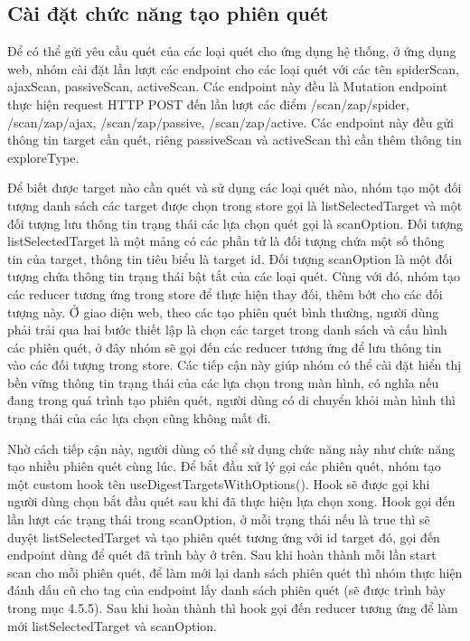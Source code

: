 \subsection{Cài đặt chức năng tạo phiên quét}

\tab Để có thể gửi yêu cầu quét của các loại quét cho ứng dụng hệ thống, ở ứng dụng web, nhóm cài đặt lần lượt các endpoint cho các loại quét với các tên spiderScan, ajaxScan, passiveScan, activeScan. Các endpoint này đều là Mutation endpoint thực hiện request HTTP POST đến lần lượt các điểm /scan/zap/spider, /scan/zap/ajax, /scan/zap/passive, /scan/zap/active. Các endpoint này đều gửi thông tin target cần quét, riêng passiveScan và activeScan thì cần thêm thông tin exploreType.

Để biết được target nào cần quét và sử dụng các loại quét nào, nhóm tạo một đối tượng danh sách các target được chọn trong store gọi là listSelectedTarget và một đối tượng lưu thông tin trạng thái các lựa chọn quét gọi là scanOption. Đối tượng listSelectedTarget là một mảng có các phần tử là đối tượng chứa một số thông tin của target, thông tin tiêu biểu là target id. Đối tượng scanOption là một đối tượng chứa thông tin trạng thái bật tắt của các loại quét. Cùng với đó, nhóm tạo các reducer tương ứng trong store để thực hiện thay đối, thêm bớt cho các đối tượng này. Ở giao diện web, theo các tạo phiên quét bình thường, người dùng phải trải qua hai bước thiết lập là chọn các target trong danh sách và cấu hình các phiên quét, ở đây nhóm sẽ gọi đến các reducer tương ứng để lưu thông tin vào các đối tượng trong store. Các tiếp cận này giúp nhóm có thể cài đặt hiển thị bền vững thông tin trạng thái của các lựa chọn trong màn hình, có nghĩa nếu đang trong quá trình tạo phiên quét, người dùng có di chuyển khỏi màn hình thì trạng thái của các lựa chọn cũng không mất đi.

Nhờ cách tiếp cận này, người dùng có thể sử dụng chức năng này như chức năng tạo nhiều phiên quét cùng lúc. Để bắt đầu xử lý gọi các phiên quét, nhóm tạo một custom hook tên useDigestTargetsWithOptions(). Hook sẽ được gọi khi người dùng chọn bắt đầu quét sau khi đã thực hiện lựa chọn xong. Hook gọi đến lần lượt các trạng thái trong scanOption, ở mỗi trạng thái nếu là true thì sẽ duyệt listSelectedTarget và tạo phiên quét tương ứng với id target đó, gọi đến endpoint dùng để quét đã trình bày ở trên. Sau khi hoàn thành mỗi lần start scan cho mỗi phiên quét, để làm mới lại danh sách phiên quét thì nhóm thực hiện đánh dấu cũ cho tag của endpoint lấy danh sách phiên quét (sẽ được trình bày trong mục 4.5.5). Sau khi hoàn thành thì hook gọi đến reducer tương ứng để làm mới listSelectedTarget và scanOption.

